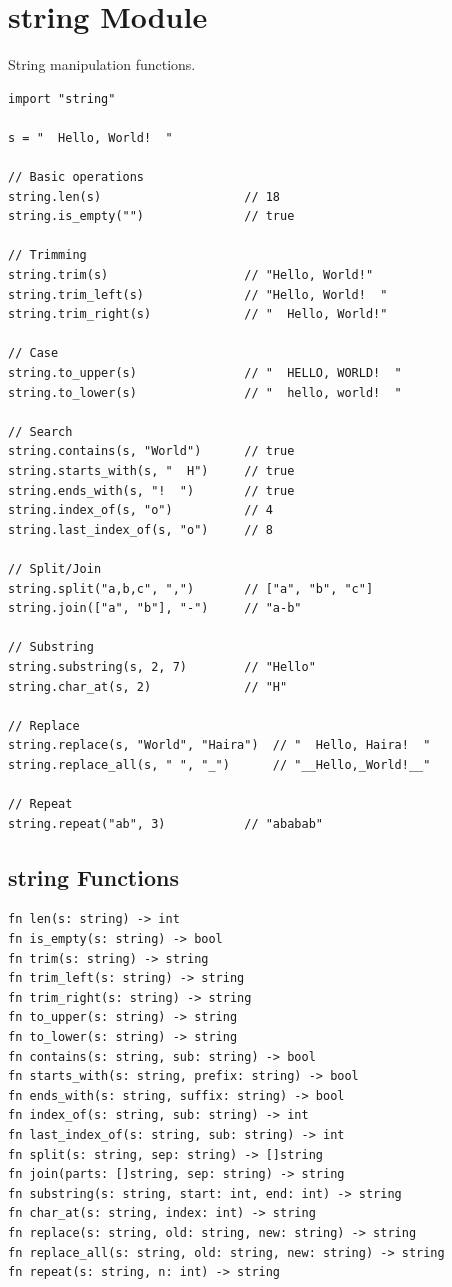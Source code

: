 \section{string Module}

String manipulation functions.

\begin{lstlisting}
import "string"

s = "  Hello, World!  "

// Basic operations
string.len(s)                    // 18
string.is_empty("")              // true

// Trimming
string.trim(s)                   // "Hello, World!"
string.trim_left(s)              // "Hello, World!  "
string.trim_right(s)             // "  Hello, World!"

// Case
string.to_upper(s)               // "  HELLO, WORLD!  "
string.to_lower(s)               // "  hello, world!  "

// Search
string.contains(s, "World")      // true
string.starts_with(s, "  H")     // true
string.ends_with(s, "!  ")       // true
string.index_of(s, "o")          // 4
string.last_index_of(s, "o")     // 8

// Split/Join
string.split("a,b,c", ",")       // ["a", "b", "c"]
string.join(["a", "b"], "-")     // "a-b"

// Substring
string.substring(s, 2, 7)        // "Hello"
string.char_at(s, 2)             // "H"

// Replace
string.replace(s, "World", "Haira")  // "  Hello, Haira!  "
string.replace_all(s, " ", "_")      // "__Hello,_World!__"

// Repeat
string.repeat("ab", 3)           // "ababab"
\end{lstlisting}

\subsection{string Functions}

\begin{lstlisting}
fn len(s: string) -> int
fn is_empty(s: string) -> bool
fn trim(s: string) -> string
fn trim_left(s: string) -> string
fn trim_right(s: string) -> string
fn to_upper(s: string) -> string
fn to_lower(s: string) -> string
fn contains(s: string, sub: string) -> bool
fn starts_with(s: string, prefix: string) -> bool
fn ends_with(s: string, suffix: string) -> bool
fn index_of(s: string, sub: string) -> int
fn last_index_of(s: string, sub: string) -> int
fn split(s: string, sep: string) -> []string
fn join(parts: []string, sep: string) -> string
fn substring(s: string, start: int, end: int) -> string
fn char_at(s: string, index: int) -> string
fn replace(s: string, old: string, new: string) -> string
fn replace_all(s: string, old: string, new: string) -> string
fn repeat(s: string, n: int) -> string
\end{lstlisting}

